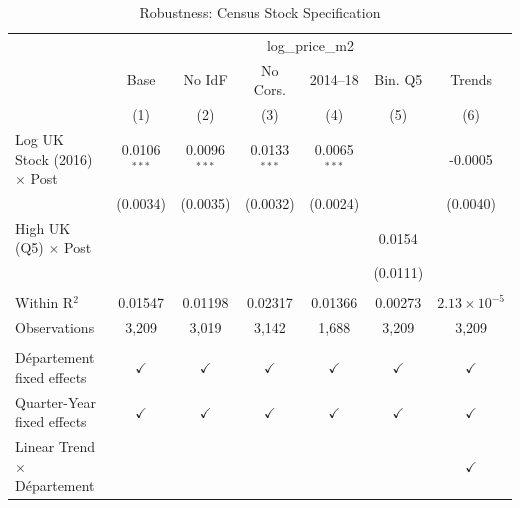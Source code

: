
\begin{table}[htbp]
   \caption{\label{tab:robust} Robustness: Census Stock Specification}
   \bigskip
   \centering
   \begin{tabular}{lcccccc}
      \toprule
       & \multicolumn{6}{c}{log\_price\_m2}\\
                                             & Base           & No IdF         & No Cors.       & 2014--18       & Bin. Q5       & Trends \\   
                                             & (1)            & (2)            & (3)            & (4)            & (5)           & (6)\\  
      \midrule 
      Log UK Stock (2016) $\times$ Post      & 0.0106$^{***}$ & 0.0096$^{***}$ & 0.0133$^{***}$ & 0.0065$^{***}$ &               & -0.0005\\   
                                             & (0.0034)       & (0.0035)       & (0.0032)       & (0.0024)       &               & (0.0040)\\   
      High UK (Q5) $\times$ Post             &                &                &                &                & 0.0154        &   \\   
                                             &                &                &                &                & (0.0111)      &   \\   
       \\
      Within R$^2$                           & 0.01547        & 0.01198        & 0.02317        & 0.01366        & 0.00273       & $2.13\times 10^{-5}$\\   
      Observations                           & 3,209          & 3,019          & 3,142          & 1,688          & 3,209         & 3,209\\  
       \\
      D\'epartement fixed effects            & $\checkmark$   & $\checkmark$   & $\checkmark$   & $\checkmark$   & $\checkmark$  & $\checkmark$\\   
      Quarter-Year fixed effects             & $\checkmark$   & $\checkmark$   & $\checkmark$   & $\checkmark$   & $\checkmark$  & $\checkmark$\\   
      Linear Trend $\times $ D\'epartement   &                &                &                &                &               & $\checkmark$\\   
      \bottomrule
   \end{tabular}
\end{table}


